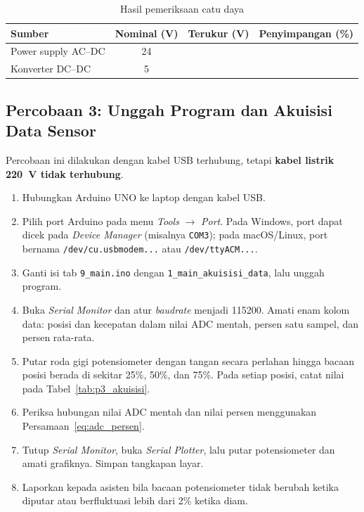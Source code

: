 \documentclass[11pt,a4paper]{article}
\newcommand{\prog}[1]{\texttt{#1}}
\begin{document}
\begin{table}[H]
	\centering
	\caption{Hasil pemeriksaan catu daya}
	\label{tab:p2_catu_daya}
	\begin{tabular}{|l|c|c|c|}
		\hline
		\textbf{Sumber}       & \textbf{Nominal (V)} & \textbf{Terukur (V)} & \textbf{Penyimpangan (\%)} \\
		\hline
		Power supply AC--DC   & 24                   &                      &                            \\
		Konverter DC--DC      & 5                    &                      &                            \\
		\hline
	\end{tabular}
\end{table}

\subsection{Percobaan 3: Unggah Program dan Akuisisi Data Sensor}
Percobaan ini dilakukan dengan kabel USB terhubung, tetapi \textbf{kabel listrik 220~V tidak terhubung}.
\begin{enumerate}
	\item Hubungkan Arduino UNO ke laptop dengan kabel USB.
	\item Pilih port Arduino pada menu \textit{Tools} $\rightarrow$ \textit{Port}. Pada Windows, port dapat dicek pada \textit{Device Manager} (misalnya \texttt{COM3}); pada macOS/Linux, port bernama \texttt{/dev/cu.usbmodem...} atau \texttt{/dev/ttyACM...}.
	\item Ganti isi tab \prog{9\_main.ino} dengan \prog{1\_main\_akuisisi\_data}, lalu unggah program.
	\item Buka \textit{Serial Monitor} dan atur \textit{baudrate} menjadi 115200. Amati enam kolom data: posisi dan kecepatan dalam nilai ADC mentah, persen satu sampel, dan persen rata-rata.
	\item Putar roda gigi potensiometer dengan tangan secara perlahan hingga bacaan posisi berada di sekitar 25\%, 50\%, dan 75\%. Pada setiap posisi, catat nilai pada Tabel~\ref{tab:p3_akuisisi}.
	\item Periksa hubungan nilai ADC mentah dan nilai persen menggunakan Persamaan~\eqref{eq:adc_persen}.
	\item Tutup \textit{Serial Monitor}, buka \textit{Serial Plotter}, lalu putar potensiometer dan amati grafiknya. Simpan tangkapan layar.
	\item Laporkan kepada asisten bila bacaan potensiometer tidak berubah ketika diputar atau berfluktuasi lebih dari 2\% ketika diam.
\end{enumerate}
\end{document}
